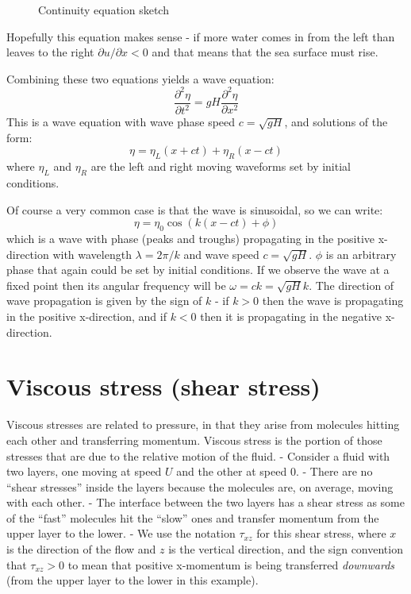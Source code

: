 \begin{figure}
\centering
\pandocbounded{}
\caption{Continuity equation sketch}
\end{figure}

Hopefully this equation makes sense - if more water comes in from the
left than leaves to the right \(\partial u/\partial x <0\) and that
means that the sea surface must rise.

Combining these two equations yields a wave equation:
\[ \frac{\partial^2 \eta}{\partial t^2} = g H \frac{\partial^2 \eta}{\partial x^2}\]
This is a wave equation with wave phase speed \(c = \sqrt{gH}\), and
solutions of the form:
\[\eta = \eta_L \left(x+ct\right) + \eta_R \left(x-ct\right)\] where
\(\eta_L\) and \(\eta_R\) are the left and right moving waveforms set by
initial conditions.

Of course a very common case is that the wave is sinusoidal, so we can
write: \[\eta = \eta_0 \cos(k(x - c t) + \phi)\] which is a wave with
phase (peaks and troughs) propagating in the positive x-direction with
wavelength \(\lambda = 2\pi/k\) and wave speed \(c = \sqrt{gH}\).
\(\phi\) is an arbitrary phase that again could be set by initial
conditions. If we observe the wave at a fixed point then its angular
frequency will be \(\omega = ck = \sqrt{gH}k\). The direction of wave
propagation is given by the sign of \(k\) - if \(k>0\) then the wave is
propagating in the positive x-direction, and if \(k<0\) then it is
propagating in the negative x-direction.

\section{Viscous stress (shear
stress)}\label{viscous-stress-shear-stress}

Viscous stresses are related to pressure, in that they arise from
molecules hitting each other and transferring momentum. Viscous stress
is the portion of those stresses that are due to the relative motion of
the fluid. - Consider a fluid with two layers, one moving at speed \(U\)
and the other at speed \(0\). - There are no ``shear stresses'' inside
the layers because the molecules are, on average, moving with each
other. - The interface between the two layers has a shear stress as some
of the ``fast'' molecules hit the ``slow'' ones and transfer momentum
from the upper layer to the lower. - We use the notation \(\tau_{xz}\)
for this shear stress, where \(x\) is the direction of the flow and
\(z\) is the vertical direction, and the sign convention that
\(\tau_{xz}>0\) to mean that positive x-momentum is being transferred
\emph{downwards} (from the upper layer to the lower in this example).

